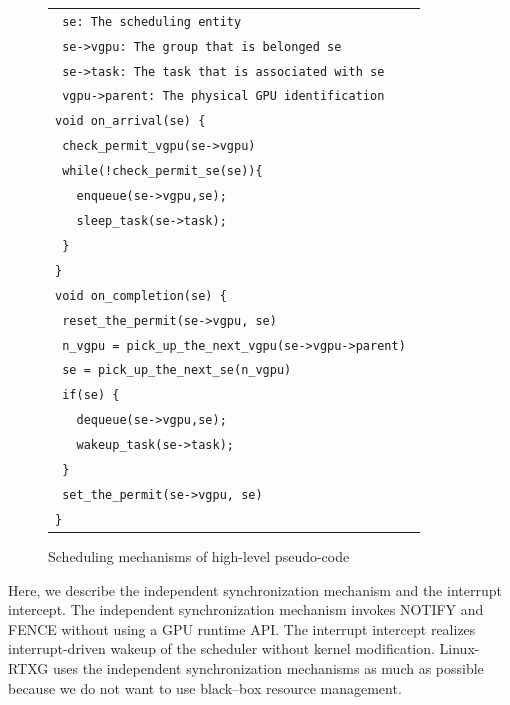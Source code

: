 \begin{figure}[t]
\begin{center}
\begin{tabular}{l}
\hline
{\scriptsize \verb| se: The scheduling entity |}\\
{\scriptsize \verb| se->vgpu: The group that is belonged se|}\\
{\scriptsize \verb| se->task: The task that is associated with se |}\\
{\scriptsize \verb| vgpu->parent: The physical GPU identification|}\\
\hline
{\scriptsize \verb|void on_arrival(se) {|}\\
{\scriptsize \verb| check_permit_vgpu(se->vgpu)    |}\\
{\scriptsize \verb| while(!check_permit_se(se)){|}\\
{\scriptsize \verb|   enqueue(se->vgpu,se); |}\\
{\scriptsize \verb|   sleep_task(se->task); |}\\
{\scriptsize \verb| }|}\\
{\scriptsize \verb|}|}\\
{\scriptsize \verb|void on_completion(se) {|}\\
{\scriptsize \verb| reset_the_permit(se->vgpu, se)|}\\
{\scriptsize \verb| n_vgpu = pick_up_the_next_vgpu(se->vgpu->parent) |}\\
{\scriptsize \verb| se = pick_up_the_next_se(n_vgpu)|}\\
{\scriptsize \verb| if(se) {|}\\
{\scriptsize \verb|   dequeue(se->vgpu,se);|}\\
{\scriptsize \verb|   wakeup_task(se->task);|}\\
{\scriptsize \verb| }|}\\
{\scriptsize \verb| set_the_permit(se->vgpu, se)|}\\
{\scriptsize \verb|}|}\\
\hline
\end{tabular}
\caption{Scheduling mechanisms of high-level pseudo-code}
\label{fig:scheduling}
\end{center}
\end{figure}

Here, we describe the independent synchronization mechanism and the interrupt intercept.
The independent synchronization mechanism invokes NOTIFY and FENCE without using a GPU runtime API.
The interrupt intercept realizes interrupt-driven wakeup of the scheduler without kernel modification.
Linux-RTXG uses the independent synchronization mechanisms as much as possible
because we do not want to use black--box resource management.

